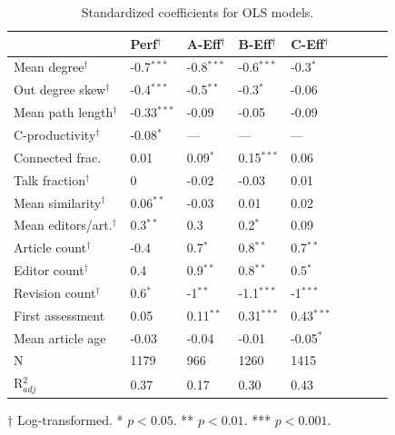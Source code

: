 \begin{table}
\small
\begin{tabular}{lllllllll}
&Perf$^\dagger$&A-Eff$^\dagger$&B-Eff$^\dagger$&C-Eff$^\dagger$\\
\hline
Mean degree$^\dagger$&-0.7$^{***}$&-0.8$^{***}$&-0.6$^{***}$&-0.3$^{*}$\\
Out degree skew$^\dagger$&-0.4$^{***}$&-0.5$^{**}$&-0.3$^{*}$&-0.06\\
Mean path length$^\dagger$&-0.33$^{***}$&-0.09&-0.05&-0.09\\
C-productivity$^\dagger$&-0.08$^{*}$&\+---&\+---&\+---\\
Connected frac.&0.01&0.09$^{*}$&0.15$^{***}$&0.06\\
Talk fraction$^\dagger$&0&-0.02&-0.03&0.01\\
Mean similarity$^\dagger$&0.06$^{**}$&-0.03&0.01&0.02\\
Mean editors/art.$^\dagger$&0.3$^{**}$&0.3&0.2$^{*}$&0.09\\
Article count$^\dagger$&-0.4&0.7$^{*}$&0.8$^{**}$&0.7$^{**}$\\
Editor count$^\dagger$&0.4&0.9$^{**}$&0.8$^{**}$&0.5$^{*}$\\
Revision count$^\dagger$&0.6$^{*}$&-1$^{**}$&-1.1$^{***}$&-1$^{***}$\\
First assessment&0.05&0.11$^{**}$&0.31$^{***}$&0.43$^{***}$\\
Mean article age&-0.03&-0.04&-0.01&-0.05$^{*}$\\
\hline
N&1179&966&1260&1415\\
R$^2_{adj}$&0.37&0.17&0.30&0.43\\
\hline
\end{tabular}
\begin{tablenotes}
\item $\dagger$ Log-transformed. * $p < 0.05$. ** $p < 0.01$. *** $p < 0.001$.
\end{tablenotes}
\caption{Standardized coefficients for OLS models.
\label{tab:model}
}
\end{table}

